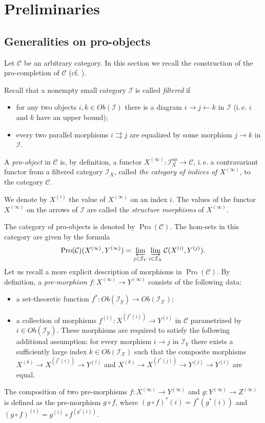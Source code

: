 \documentclass{article}
\numberwithin{equation}{section}
\theoremstyle{definition}
\theoremstyle{remark}
\DeclareMathOperator{\Pro}{Pro}
\newcommand{\op}{\mathrm{op}}
\begin{document}
\section{Preliminaries}
\subsection{Generalities on pro-objects}
Let \(\mathcal C\) be an arbitrary category.
In this section we recall the construction of the pro-completion of \(\mathcal C\) (cf. \cite[Section~6.1]{SK06}).

Recall that a nonempty small category \(\mathcal I\) is called {\it filtered} if
\begin{itemize}
 \item for any two objects \(i, k \in Ob(\mathcal{I})\) there is a diagram \(i \to j \leftarrow k\) in \(\mathcal I\) (i.\,e. $i$ and $k$ have an upper bound);
 \item every two parallel morphisms \(i \rightrightarrows j\) are equalized by some morphism \(j \to k\) in \(\mathcal I\).
\end{itemize}
A {\it pro-object} in \(\mathcal C\) is, by definition, a functor $X^{(\infty)}\colon \mathcal{I}_X^{\op} \to \mathcal{C}$, i.\,e. a contravariant functor from a filtered category \(\mathcal I_X\), called {\it the category of indices of $X^{(\infty)}$}, to the category \(\mathcal C\). 

We denote by \(X^{(i)}\) the value of \(X^{(\infty)}\) on an index \(i\).
The values of the functor $X^{(\infty)}$ on the arrows of $\mathcal{I}$ are called the {\it structure morphisms} of $X^{(\infty)}$.

The category of pro-objects is denoted by \(\Pro(\mathcal C)\). The hom-sets in this category are given by the formula
\begin{equation} \label{eq:pro-c-hom} \Pro(\mathcal C)(X^{(\infty)}, Y^{(\infty)}) = \varprojlim_{j \in \mathcal I_Y} \varinjlim_{i \in \mathcal I_X} \mathcal C(X^{(i)}, Y^{(j)}). \end{equation}
Let us recall a more explicit description of morphisms in \(\Pro(\mathcal C)\). 
By definition, a {\it pre-morphism} \(f \colon X^{(\infty)} \to Y^{(\infty)}\) consists of the following data:
\begin{itemize}
\item a set-theoretic function \(f^* \colon Ob(\mathcal{I_Y}) \to Ob(\mathcal{I_X})\);
\item a collection of morphisms \(f^{(i)} \colon X^{(f^*(i))} \to Y^{(i)}\) in $\mathcal{C}$ parametrized by $i \in Ob(\mathcal{I_Y})$. These morphisms are required to satisfy the following additional assumption: for every morphism \(i \to j\) in \(\mathcal I_Y\) there exists a sufficiently large index \(k \in Ob(\mathcal{I_X})\) such that the composite morphisms \(X^{(k)} \to X^{(f^*(i))} \to Y^{(i)}\) and \(X^{(k)} \to X^{(f^*(j))} \to Y^{(j)} \to Y^{(i)}\) are equal. \end{itemize}
The composition of two pre-morphisms \(f \colon X^{(\infty)} \to Y^{(\infty)}\) and \(g \colon Y^{(\infty)} \to Z^{(\infty)}\) is defined as the pre-morphism \(g \circ f\), where \((g \circ f)^*(i) = f^*(g^*(i))\) and \((g \circ f)^{(i)} = g^{(i)} \circ f^{(g^*(i))}\).
\end{document}
